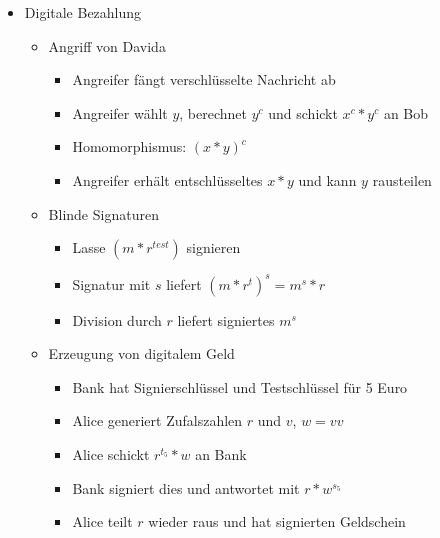 \documentclass[11pt, paper=a4, twocolumn]{scrartcl}
\begin{document}
\begin{itemize}
		\item Digitale Bezahlung
			\begin{itemize}
				\item Angriff von Davida
					\begin{itemize}
						\item Angreifer fängt verschlüsselte 
							Nachricht ab
						\item Angreifer wählt $y$, berechnet $y^c$ 
							und schickt $x^c*y^c$ an Bob
						\item Homomorphismus: $(x*y)^{c}$
						\item Angreifer erhält entschlüsseltes 
							$x*y$ und kann $y$ rausteilen
					\end{itemize}
				\item Blinde Signaturen
					\begin{itemize}
						\item Lasse $(m*r^{test})$ signieren
						\item Signatur mit $s$ liefert 
							$(m*r^t)^s=m^s*r$
						\item Division durch $r$ liefert 
							signiertes $m^s$
					\end{itemize}
				\item Erzeugung von digitalem Geld
					\begin{itemize}
						\item Bank hat Signierschlüssel und 
							Testschlüssel für 5 Euro
						\item Alice generiert Zufalszahlen $r$ und 
							$v$, $w=vv$
						\item Alice schickt $r^{t_5}*w$ an Bank
						\item Bank signiert dies und antwortet 
							mit $r*w^{s_5}$
						\item Alice teilt $r$ wieder raus und hat 
							signierten Geldschein
					\end{itemize}
			\end{itemize}
	\end{itemize}
\end{document}
